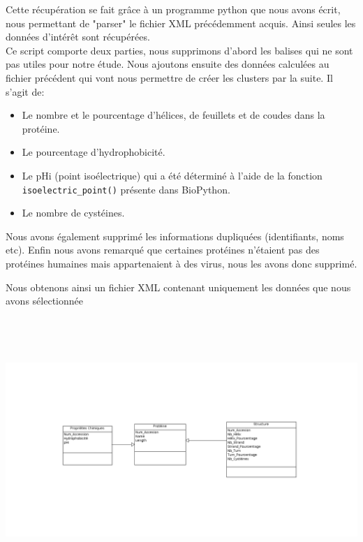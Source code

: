 Cette récupération se fait grâce à un programme python que nous avons écrit, nous permettant de "parser" le fichier XML précédemment acquis. Ainsi seules les données d'intérêt sont récupérées.\\

Ce script comporte deux parties, nous supprimons d'abord les balises qui ne sont pas utiles pour notre étude.
Nous ajoutons ensuite des données calculées au fichier précédent qui vont nous permettre de créer les clusters par la suite. Il s'agit de:
\begin{itemize}
\item Le nombre et le pourcentage d'hélices, de feuillets et de coudes dans la protéine.
\item Le pourcentage d'hydrophobicité.
\item Le pHi (point isoélectrique) qui a été déterminé à l'aide de la fonction\\ \texttt{isoelectric\_point()} présente dans BioPython.
\item Le nombre de cystéines.
\end{itemize}

Nous avons également supprimé les informations dupliquées (identifiants, noms etc).
Enfin nous avons remarqué que certaines protéines n'étaient pas des protéines humaines mais appartenaient à des virus, nous les avons donc supprimé.

Nous obtenons ainsi un fichier XML contenant uniquement les données que nous avons sélectionnée

\includegraphics[width=20cm, height=10cm]{structure_etoile.png}\\[1cm]

